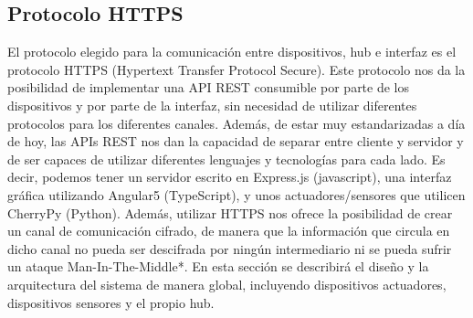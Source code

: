 \subsection{Protocolo HTTPS}
El protocolo elegido para la comunicación entre dispositivos, hub e interfaz es el protocolo HTTPS (Hypertext Transfer Protocol Secure).
\newline
Este protocolo nos da la posibilidad de implementar una API REST consumible por parte de los dispositivos y por parte de la interfaz,
sin necesidad de utilizar diferentes protocolos para los diferentes canales.
\newline
Además, de estar muy estandarizadas a día de hoy, las APIs REST nos dan la capacidad de separar entre cliente y servidor y de ser capaces
de utilizar diferentes lenguajes y tecnologías para cada lado. Es decir, podemos tener un servidor escrito en Express.js (javascript), una interfaz 
gráfica utilizando Angular5 (TypeScript), y unos actuadores/sensores que utilicen CherryPy (Python).
\newline
Además, utilizar HTTPS nos ofrece la posibilidad de crear un canal de comunicación cifrado, de manera que la información que circula en dicho 
canal no pueda ser descifrada por ningún intermediario ni se pueda sufrir un ataque Man-In-The-Middle*.
En esta sección se describirá el diseño y la arquitectura del sistema de manera global, incluyendo dispositivos actuadores, 
dispositivos sensores y el propio hub.
